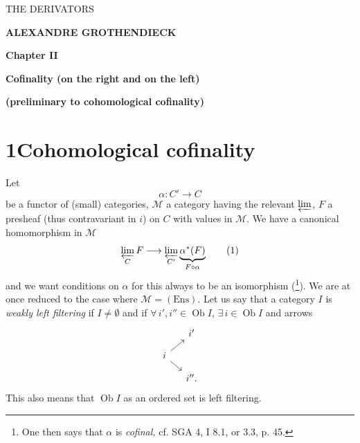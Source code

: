 \documentclass[11pt]{article}
\newcommand{\printedpage}[1]{\marginpar{\footnotesize p.~#1}}
\newcommand{\msp}[1]{\marginpar{\footnotesize [#1]}}
\begin{document}
\printedpage{--}

\begin{center}
\vspace*{4cm}
{\Large\textsf{THE DERIVATORS}}

\bigskip\bigskip

\textbf{ALEXANDRE GROTHENDIECK}

\bigskip\bigskip\bigskip

\textbf{Chapter II}

\textbf{Cofinality (on the right and on the left)}

\textbf{(preliminary to cohomological cofinality)}
\end{center}

\clearpage


\printedpage{1}

\msp{page 1}

\section*{1\quad Cohomological cofinality}

Let
\[ \alpha : C' \longrightarrow C \]
be a functor of (small) categories, $\mathcal{M}$ a category having the relevant $\varprojlim$, $F$ a presheaf (thus contravariant in $i$) on $C$ with values in $\mathcal{M}$. We have a canonical homomorphism in $\mathcal{M}$
\[ \varprojlim_{C} F \longrightarrow \varprojlim_{C'} \underbrace{\alpha^*(F)}_{F\circ\alpha} \tag*{(1)} \]
and we want conditions on $\alpha$ for this always to be an isomorphism (\footnote{One then says that $\alpha$ is \textit{cofinal,} cf. SGA 4, I 8.1, or 3.3, p. 45.}). We are at once reduced to the case where $\mathcal{M} = (\mathrm{Ens})$. Let us say that a category $I$ is \textit{weakly left filtering} if $I \neq \emptyset$ and if $\forall\, i', i'' \in \operatorname{Ob} I$, $\exists\, i \in \operatorname{Ob} I$ and arrows
\[
\begin{tikzcd}[row sep=small, column sep=small]
 & i' \\
i \arrow[ur] \arrow[dr] & \\
 & i''.
\end{tikzcd}
\]
This also means that $\operatorname{Ob} I$ as an ordered set is left filtering.
\end{document}

